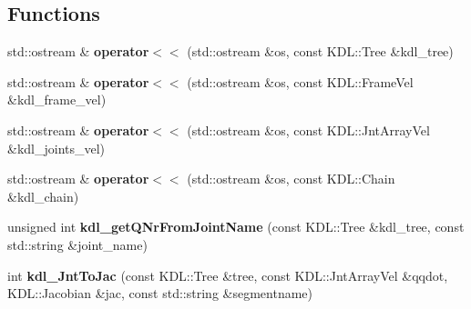 \subsection*{Functions}
\begin{DoxyCompactItemize}
\item 
\hypertarget{namespacehiqp_ace17cd6f24f52ba09f129ab50f435f99}{std\-::ostream \& {\bfseries operator$<$$<$} (std\-::ostream \&os, const K\-D\-L\-::\-Tree \&kdl\-\_\-tree)}\label{namespacehiqp_ace17cd6f24f52ba09f129ab50f435f99}

\item 
\hypertarget{namespacehiqp_a59fe109d0df644e9ead2b56f8d86bf89}{std\-::ostream \& {\bfseries operator$<$$<$} (std\-::ostream \&os, const K\-D\-L\-::\-Frame\-Vel \&kdl\-\_\-frame\-\_\-vel)}\label{namespacehiqp_a59fe109d0df644e9ead2b56f8d86bf89}

\item 
\hypertarget{namespacehiqp_a33d4a297971bc3e2996aa1f3194b0e30}{std\-::ostream \& {\bfseries operator$<$$<$} (std\-::ostream \&os, const K\-D\-L\-::\-Jnt\-Array\-Vel \&kdl\-\_\-joints\-\_\-vel)}\label{namespacehiqp_a33d4a297971bc3e2996aa1f3194b0e30}

\item 
\hypertarget{namespacehiqp_a6a26da69453463527d0b4c99884983c9}{std\-::ostream \& {\bfseries operator$<$$<$} (std\-::ostream \&os, const K\-D\-L\-::\-Chain \&kdl\-\_\-chain)}\label{namespacehiqp_a6a26da69453463527d0b4c99884983c9}

\item 
\hypertarget{namespacehiqp_a673449513c090a51acfecade84fa3e60}{unsigned int {\bfseries kdl\-\_\-get\-Q\-Nr\-From\-Joint\-Name} (const K\-D\-L\-::\-Tree \&kdl\-\_\-tree, const std\-::string \&joint\-\_\-name)}\label{namespacehiqp_a673449513c090a51acfecade84fa3e60}

\item 
\hypertarget{namespacehiqp_a9266d35577397a64d24935da167b406a}{int {\bfseries kdl\-\_\-\-Jnt\-To\-Jac} (const K\-D\-L\-::\-Tree \&tree, const K\-D\-L\-::\-Jnt\-Array\-Vel \&qqdot, K\-D\-L\-::\-Jacobian \&jac, const std\-::string \&segmentname)}\label{namespacehiqp_a9266d35577397a64d24935da167b406a}


\end{DoxyCompactItemize}
